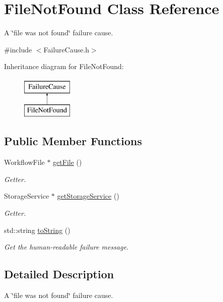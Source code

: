 \hypertarget{class_file_not_found}{}\section{File\+Not\+Found Class Reference}
\label{class_file_not_found}


A \char`\"{}file was not found\char`\"{} failure cause.  




{\ttfamily \#include $<$Failure\+Cause.\+h$>$}

Inheritance diagram for File\+Not\+Found\+:\begin{figure}[H]
\begin{center}
\leavevmode
\includegraphics[height=2.000000cm]{class_file_not_found}
\end{center}
\end{figure}
\subsection*{Public Member Functions}
\begin{DoxyCompactItemize}
\item 
Workflow\+File $\ast$ \hyperlink{class_file_not_found_a8e4ccf87c3e797a454b268676ab8a5ec}{get\+File} ()
\begin{DoxyCompactList}\small\item\em Getter. \end{DoxyCompactList}\item 
Storage\+Service $\ast$ \hyperlink{class_file_not_found_abfa7b0436794b71310f46c9a31553241}{get\+Storage\+Service} ()
\begin{DoxyCompactList}\small\item\em Getter. \end{DoxyCompactList}\item 
std\+::string \hyperlink{class_file_not_found_ad5326f57546e7ceb3c707004d7741872}{to\+String} ()
\begin{DoxyCompactList}\small\item\em Get the human-\/readable failure message. \end{DoxyCompactList}\end{DoxyCompactItemize}


\subsection{Detailed Description}
A \char`\"{}file was not found\char`\"{} failure cause. 

